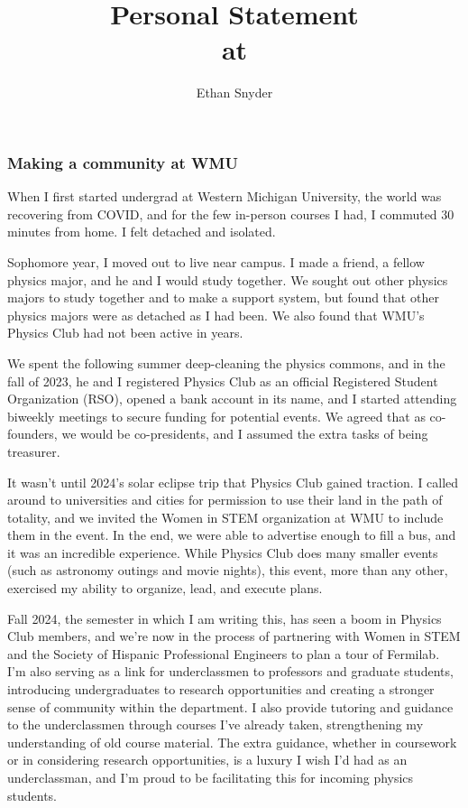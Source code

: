 \documentclass[11pt]{article}
\title{\vspace{-5em}Personal Statement\\
	\large \dept{} at \school{}}
\author{Ethan Snyder}
\date{}
\begin{document}
\maketitle
\subsubsection*{Making a community at WMU}
When I first started undergrad at Western Michigan University, the world was recovering from COVID, and for the few in-person courses I had, I commuted 30 minutes from home. I felt detached and isolated.

Sophomore year, I moved out to live near campus. I made a friend, a fellow physics major, and he and I would study together. We sought out other physics majors to study together and to make a support system, but found that other physics majors were as detached as I had been. We also found that WMU's Physics Club had not been active in years.

We spent the following summer deep-cleaning the physics commons, and in the fall of 2023, he and I registered Physics Club as an official Registered Student Organization (RSO), opened a bank account in its name, and I started attending biweekly meetings to secure funding for potential events. We agreed that as co-founders, we would be co-presidents, and I assumed the extra tasks of being treasurer.

It wasn't until 2024's solar eclipse trip that Physics Club gained traction. I called around to universities and cities for permission to use their land in the path of totality, and we invited the Women in STEM organization at WMU to include them in the event. In the end, we were able to advertise enough to fill a bus, and it was an incredible experience. While Physics Club does many smaller events (such as astronomy outings and movie nights), this event, more than any other, exercised my ability to organize, lead, and execute plans.

Fall 2024, the semester in which I am writing this, has seen a boom in Physics Club members, and we're now in the process of partnering with Women in STEM and the Society of Hispanic Professional Engineers to plan a tour of Fermilab. I'm also serving as a link for underclassmen to professors and graduate students, introducing undergraduates to research opportunities and creating a stronger sense of community within the department. I also provide tutoring and guidance to the underclassmen through courses I've already taken, strengthening my understanding of old course material. The extra guidance, whether in coursework or in considering research opportunities, is a luxury I wish I'd had as an underclassman, and I'm proud to be facilitating this for incoming physics students.
\end{document}

